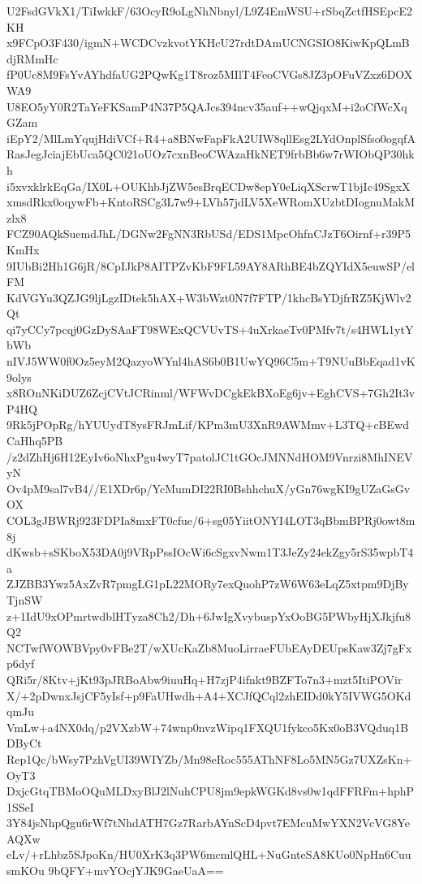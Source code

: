 U2FsdGVkX1/TiIwkkF/63OcyR9oLgNhNbnyl/L9Z4EmWSU+rSbqZctfHSEpcE2KH
x9FCpO3F430/igmN+WCDCvzkvotYKHcU27rdtDAmUCNGSIO8KiwKpQLmBdjRMmHc
fP0Uc8M9FsYvAYhdfaUG2PQwKg1T8roz5MIlT4FeoCVGs8JZ3pOFuVZxz6DOXWA9
U8EO5yY0R2TaYeFKSamP4N37P5QAJcs394ncv35auf++wQjqxM+i2oCfWcXqGZam
iEpY2/MlLmYqujHdiVCf+R4+a8BNwFapFkA2UIW8qllEsg2LYdOnplSfso0ogqfA
RasJegJciajEbUca5QC021oUOz7cxnBeoCWAzaHkNET9frbBb6w7rWIObQP30hkh
i5xvxklrkEqGa/IX0L+OUKhbJjZW5esBrqECDw8epY0eLiqXScrwT1bjIc49SgxX
xmsdRkx0oqywFb+KntoRSCg3L7w9+LVh57jdLV5XeWRomXUzbtDIognuMakMzlx8
FCZ90AQkSuemdJhL/DGNw2FgNN3RbUSd/EDS1MpcOhfnCJzT6Oirnf+r39P5KmHx
9IUbBi2Hh1G6jR/8CpIJkP8AITPZvKbF9FL59AY8ARhBE4bZQYIdX5euwSP/elFM
KdVGYu3QZJG9ljLgzIDtek5hAX+W3bWzt0N7f7FTP/1khcBsYDjfrRZ5KjWlv2Qt
qi7yCCy7pcqj0GzDySAaFT98WExQCVUvTS+4uXrkaeTv0PMfv7t/s4HWL1ytYbWb
nIVJ5WW0f0Oz5eyM2QazyoWYnl4hAS6b0B1UwYQ96C5m+T9NUuBbEqad1vK9olys
x8ROnNKiDUZ6ZcjCVtJCRinml/WFWvDCgkEkBXoEg6jv+EghCVS+7Gh2It3vP4HQ
9Rk5jPOpRg/hYUUydT8ysFRJmLif/KPm3mU3XnR9AWMmv+L3TQ+cBEwdCaHhq5PB
/z2dZhHj6H12EyIv6oNhxPgu4wyT7patolJC1tGOcJMNNdHOM9Vnrzi8MhINEVyN
Ov4pM9sal7vB4//E1XDr6p/YcMumDI22RI0BshhchuX/yGn76wgKI9gUZaGsGvOX
COL3gJBWRj923FDPIa8mxFT0cfue/6+sg05YiitONYI4LOT3qBbmBPRj0owt8m8j
dKwsb+sSKboX53DA0j9VRpPssIOcWi6cSgxvNwm1T3JeZy24ekZgy5rS35wpbT4a
ZJZBB3Ywz5AxZvR7pmgLG1pL22MORy7exQuohP7zW6W63eLqZ5xtpm9DjByTjnSW
z+1IdU9xOPmrtwdblHTyza8Ch2/Dh+6JwIgXvybuspYxOoBG5PWbyHjXJkjfu8Q2
NCTwfWOWBVpy0vFBe2T/wXUcKaZb8MuoLirraeFUbEAyDEUpsKaw3Zj7gFxp6dyf
QRi5r/8Ktv+jKt93pJRBoAbw9iuuHq+H7zjP4ifnkt9BZFTo7n3+mzt5ItiPOVir
X/+2pDwnxJsjCF5yIsf+p9FaUHwdh+A4+XCJfQCql2zhEIDd0kY5IVWG5OKdqmJu
VmLw+a4NX0dq/p2VXzbW+74wnp0nvzWipq1FXQU1fykco5Kx0oB3VQduq1BDByCt
Rep1Qc/bWsy7PzhVgUI39WIYZb/Mn98eRoc555AThNF8Lo5MN5Gz7UXZsKn+OyT3
DxjcGtqTBMoOQuMLDxyBlJ2lNuhCPU8jm9epkWGKd8vs0w1qdFFRFm+hphP1SSeI
3Y84jsNhpQgu6rWf7tNhdATH7Gz7RarbAYnScD4pvt7EMcuMwYXN2VcVG8YeAQXw
eLv/+rLhbz5SJpoKn/HU0XrK3q3PW6mcmlQHL+NuGnteSA8KUo0NpHn6CuusmKOu
9bQFY+mvYOcjYJK9GaeUaA==
